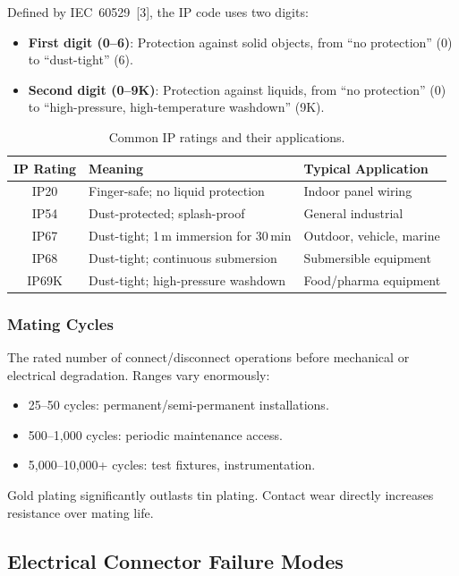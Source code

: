 \documentclass[11pt,letterpaper,twoside,openany]{book}
\begin{document}
Defined by IEC~60529~[3], the IP code uses two digits:
\begin{itemize}[nosep,leftmargin=1.5em]
  \item \textbf{First digit (0--6)}: Protection against solid objects, from ``no protection'' (0) to ``dust-tight'' (6).
  \item \textbf{Second digit (0--9K)}: Protection against liquids, from ``no protection'' (0) to ``high-pressure, high-temperature washdown'' (9K).
\end{itemize}

\begin{table}[htbp]
\centering
\small
\begin{tabular}{c l l}
  \toprule
  \textbf{IP Rating} & \textbf{Meaning} & \textbf{Typical Application} \\
  \midrule
  IP20 & Finger-safe; no liquid protection & Indoor panel wiring \\
  IP54 & Dust-protected; splash-proof & General industrial \\
  IP67 & Dust-tight; 1\,m immersion for 30\,min & Outdoor, vehicle, marine \\
  IP68 & Dust-tight; continuous submersion & Submersible equipment \\
  IP69K & Dust-tight; high-pressure washdown & Food/pharma equipment \\
  \bottomrule
\end{tabular}
\caption{Common IP ratings and their applications.}
\end{table}

\subsubsection{Mating Cycles}

The rated number of connect/disconnect operations before mechanical or electrical degradation. Ranges vary enormously:
\begin{itemize}[nosep,leftmargin=1.5em]
  \item 25--50 cycles: permanent/semi-permanent installations.
  \item 500--1,000 cycles: periodic maintenance access.
  \item 5,000--10,000+ cycles: test fixtures, instrumentation.
\end{itemize}
Gold plating significantly outlasts tin plating. Contact wear directly increases resistance over mating life.


\subsection{Electrical Connector Failure Modes}
\label{sec:elecfailure}
\end{document}
